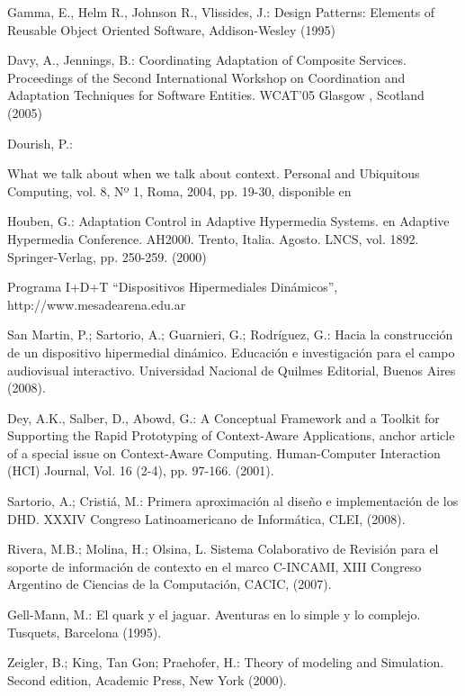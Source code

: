 \begin{thebibliography}{1}
Gamma, E., Helm R., Johnson R., Vlissides, J.: {Design Patterns: Elements of
Reusable Object Oriented Software, Addison-Wesley (1995)}

Davy, A., Jennings, B.: {Coordinating Adaptation of Composite
Services. Proceedings of the Second International Workshop on Coordination and
Adaptation Techniques for Software Entities. WCAT’05 Glasgow , Scotland (2005)}


Dourish, P.: {What we talk about when we talk about context. Personal
and Ubiquitous Computing, vol. 8, Nº 1, Roma, 2004, pp. 19-30, disponible
en 

Houben, G.: {Adaptation Control in Adaptive Hypermedia Systems. en Adaptive
Hypermedia Conference. AH2000. Trento, Italia. Agosto. LNCS, vol.
1892. Springer-Verlag, pp. 250-259. (2000)}

Programa I+D+T “Dispositivos Hipermediales
Dinámicos”, http://www.mesadearena.edu.ar

San Martin, P.; Sartorio, A.; Guarnieri, G.; Rodríguez, G.: Hacia la
construcción de un dispositivo hipermedial dinámico. Educación e investigación
para el campo audiovisual interactivo. Universidad Nacional de Quilmes
Editorial, Buenos Aires (2008).

Dey, A.K., Salber, D., Abowd, G.: A Conceptual Framework and a Toolkit for
Supporting the Rapid Prototyping of Context-Aware Applications, anchor article
of a special issue on Context-Aware Computing. Human-Computer Interaction (HCI)
Journal, Vol. 16 (2-4), pp. 97-166. (2001).

Sartorio, A.; Cristiá, M.: Primera aproximación al diseño e implementación de
los DHD. XXXIV Congreso Latinoamericano de Informática, CLEI, (2008).

Rivera, M.B.; Molina, H.; Olsina, L. Sistema Colaborativo de Revisión para el
soporte de información de contexto en el marco C-INCAMI, XIII Congreso Argentino
de Ciencias de la Computación, CACIC, (2007).

Gell-Mann, M.: El quark y el jaguar. Aventuras en lo simple y lo complejo.
Tusquets, Barcelona (1995).

Zeigler, B.; King, Tan Gon; Praehofer, H.: Theory of modeling and Simulation.
Second edition, Academic Press, New York (2000).

}
\end{thebibliography}

